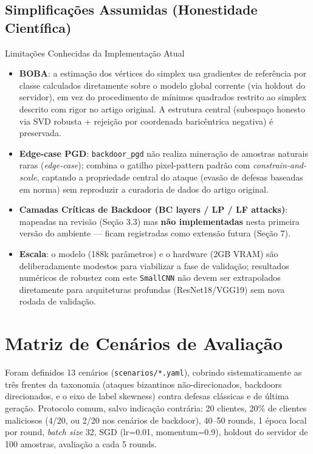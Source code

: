 \documentclass[11pt,a4paper]{article}
\begin{document}
\subsection{Simplificações Assumidas (Honestidade Científica)}
\begin{alertbox}{Limitações Conhecidas da Implementação Atual}
\begin{itemize}
\item \textbf{BOBA}: a estimação dos vértices do simplex usa gradientes de referência por classe
  calculados diretamente sobre o modelo global corrente (via holdout do servidor), em vez do
  procedimento de mínimos quadrados restrito ao simplex descrito com rigor no artigo original. A
  estrutura central (subespaço honesto via SVD robusta + rejeição por coordenada baricêntrica negativa)
  é preservada.
\item \textbf{Edge-case PGD}: \texttt{backdoor\_pgd} não realiza mineração de amostras naturais raras
  (\textit{edge-case}); combina o gatilho pixel-pattern padrão com \textit{constrain-and-scale}, captando
  a propriedade central do ataque (evasão de defesas baseadas em norma) sem reproduzir a curadoria de
  dados do artigo original.
\item \textbf{Camadas Críticas de Backdoor (BC layers / LP / LF attacks)}: mapeadas na revisão
  (Seção 3.3) mas \textbf{não implementadas} nesta primeira versão do ambiente — ficam registradas como
  extensão futura (Seção 7).
\item \textbf{Escala}: o modelo (188k parâmetros) e o hardware (2GB VRAM) são deliberadamente modestos
  para viabilizar a fase de validação; resultados numéricos de robustez com este \texttt{SmallCNN} não
  devem ser extrapolados diretamente para arquiteturas profundas (ResNet18/VGG19) sem nova rodada de
  validação.
\end{itemize}
\end{alertbox}

\section{Matriz de Cenários de Avaliação}
Foram definidos 13 cenários (\texttt{scenarios/*.yaml}), cobrindo sistematicamente as três frentes da
taxonomia (ataques bizantinos não-direcionados, backdoors direcionados, e o eixo de label skewness) contra
defesas clássicas e de última geração. Protocolo comum, salvo indicação contrária: 20 clientes, 20\% de
clientes maliciosos (4/20, ou 2/20 nos cenários de backdoor), 40--50 rounds, 1 época local por round,
\textit{batch size} 32, SGD (lr=0.01, momentum=0.9), holdout do servidor de 100 amostras, avaliação a cada
5 rounds.
\end{document}
